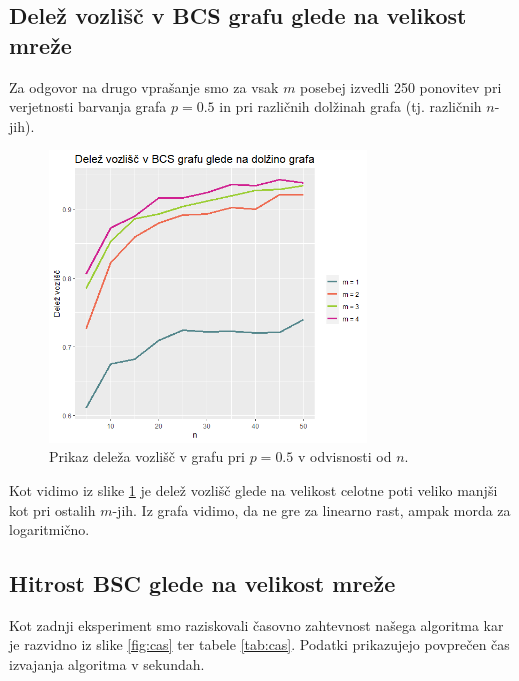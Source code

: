 \documentclass[a4paper, 11pt]{article}
\theoremstyle{definition}
\theoremstyle{definition}
\begin{document}
\newpage

\subsection{Delež vozlišč v BCS grafu glede na velikost mreže}

Za odgovor na drugo vprašanje smo za vsak $m$ posebej izvedli 250 ponovitev pri 
verjetnosti barvanja grafa $p = 0.5$ in pri različnih dolžinah grafa 
(tj. različnih $n$-jih). 

\begin{figure}[h]
    \centering
    \includegraphics[width=0.75\textwidth]{delez.png}
    \caption{Prikaz deleža vozlišč v grafu pri $p=0.5$ v
    odvisnosti od $n$.}
    \label{fig:delez}
\end{figure}


Kot vidimo iz slike \ref{fig:delez} je delež vozlišč glede na 
velikost celotne poti veliko manjši kot pri ostalih $m$-jih. 
Iz grafa vidimo, da ne gre za linearno rast, ampak morda za logaritmično.


\subsection{Hitrost BSC glede na velikost mreže}

Kot zadnji eksperiment smo raziskovali časovno zahtevnost našega algoritma kar je 
razvidno iz slike \ref{fig:cas} ter tabele \ref{tab:cas}.
Podatki prikazujejo povprečen čas izvajanja algoritma v sekundah. 
\end{document}
